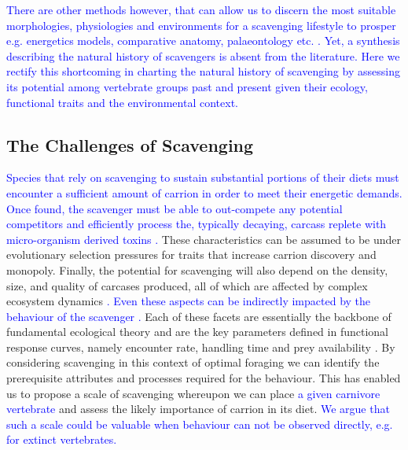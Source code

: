 \documentclass[a4paper,12pt]{article}
\begin{document}
\textcolor{blue}{There are other methods however, that can allow us to discern the most suitable morphologies, physiologies and environments for a scavenging lifestyle to prosper e.g. energetics models, comparative anatomy, palaeontology etc. \citep{shipman1986scavenging,ruxton2003could}. 
Yet, a synthesis describing the natural history of scavengers is absent from the literature.
Here we rectify this shortcoming in charting the natural history of scavenging by assessing its potential among vertebrate groups past and present given their ecology, functional traits and the environmental context.}

\subsection{The Challenges of Scavenging} 

\textcolor{blue}{Species that rely on scavenging to sustain substantial portions of their diets must encounter a sufficient amount of carrion in order to meet their energetic demands.
Once found, the scavenger must be able to out-compete any potential competitors and efficiently process the, typically decaying, carcass replete with micro-organism derived toxins \citep{ruxton2014fruit}.}
These characteristics can be assumed to be under evolutionary selection pressures for traits that increase carrion discovery and monopoly.
Finally, the potential for scavenging will also depend on the density, size, and quality of carcases produced, all of which are affected by complex ecosystem dynamics \textcolor{blue}{\citep{moleon2014inter}. 
Even these aspects can be indirectly impacted by the behaviour of the scavenger \citep{moleon2014inter}.}
Each of these facets are essentially the backbone of fundamental ecological theory and are the key parameters defined in functional response curves, namely encounter rate, handling time and prey availability \citep{jeschke2002predator}.  
By considering scavenging in this context of optimal foraging we can identify the prerequisite attributes and processes required for the behaviour. 
This has enabled us to propose a scale of scavenging whereupon we can place \textcolor{blue}{a given carnivore vertebrate} and assess the likely importance of carrion in its diet.
\textcolor{blue}{We argue that such a scale could be valuable when behaviour can not be observed directly, e.g. for extinct vertebrates.}
\end{document}
